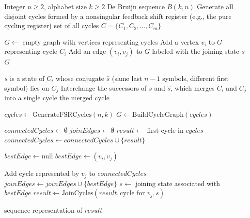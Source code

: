 \documentclass{article}
\theoremstyle{definition}
\begin{document}
\begin{algorithm}
\caption{Cycle-Joining Algorithm for $B(k, n)$}
\begin{algorithmic}[1]
\Require Integer $n \geq 2$, alphabet size $k \geq 2$
\Ensure De Bruijn sequence $B(k, n)$
    \State Generate all disjoint cycles formed by a nonsingular feedback shift register (e.g., the pure cycling register)
    \State \Return set of all cycles $C = \{C_1, C_2, \ldots, C_m\}$
\EndFunction

    \State $G \gets$ empty graph with vertices representing cycles
        \State Add a vertex $v_i$ to $G$ representing cycle $C_i$
    \EndFor
        \State Add an edge $(v_i, v_j)$ to $G$ labeled with the joining state $s$
    \EndFor
    \State \Return $G$
\EndFunction

    \State $s$ is a state of $C_i$ whose conjugate $\hat{s}$ (same last $n-1$ symbols, different first symbol) lies on $C_j$
    \State Interchange the successors of $s$ and $\hat{s}$, which merges $C_i$ and $C_j$ into a single cycle
    \State \Return the merged cycle
\EndFunction

\State $cycles \gets \text{GenerateFSRCycles}(n, k)$
\State $G \gets \text{BuildCycleGraph}(cycles)$

\State $connectedCycles \gets \emptyset$ 
\State $joinEdges \gets \emptyset$ 
\State $result \gets$ first cycle in $cycles$
\State $connectedCycles \gets connectedCycles \cup \{result\}$

    \State $bestEdge \gets \text{null}$
            \State $bestEdge \gets (v_i, v_j)$
        \EndIf
    \EndFor
    
    \State Add cycle represented by $v_j$ to $connectedCycles$
    \State $joinEdges \gets joinEdges \cup \{bestEdge\}$
    \State $s \gets$ joining state associated with $bestEdge$
    \State $result \gets \text{JoinCycles}(result, \text{cycle for } v_j, s)$
\EndWhile

\State \Return sequence representation of $result$
\end{algorithmic}
\end{algorithm}
\end{document}

